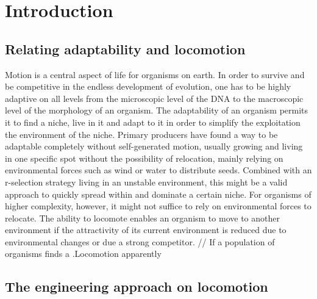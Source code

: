 \documentclass[main]{subfiles}
\begin{document}
\setcounter{chapter}{0}

\chapter{Introduction} %

\label{Chapter\thechapter} %


\section{Relating adaptability and locomotion}

Motion is a central aspect of life for organisms on earth. In order to survive and be competitive in the endless development of evolution, one has to be highly adaptive on all levels from the microscopic level of the DNA to the macroscopic level of the morphology of an organism. The adaptability of an organism permits it to find a niche, live in it and adapt to it in order to simplify the exploitation the environment of the niche. Primary producers have found a way to be adaptable completely without self-generated motion, usually growing and living in one specific spot without the possibility of relocation, mainly relying on environmental forces such as wind or water to distribute seeds. Combined with an r-selection strategy living in an unstable environment, this might be a valid approach to quickly spread within and dominate a certain niche. For organisms of higher complexity, however, it might not suffice to rely on environmental forces to relocate. The ability to locomote enables an organism to move to another environment if the attractivity of its current environment is reduced due to environmental changes or due a strong competitor. // If a population of organisms finds a .Locomotion apparently 


\section{The engineering approach on locomotion}
\end{document}
